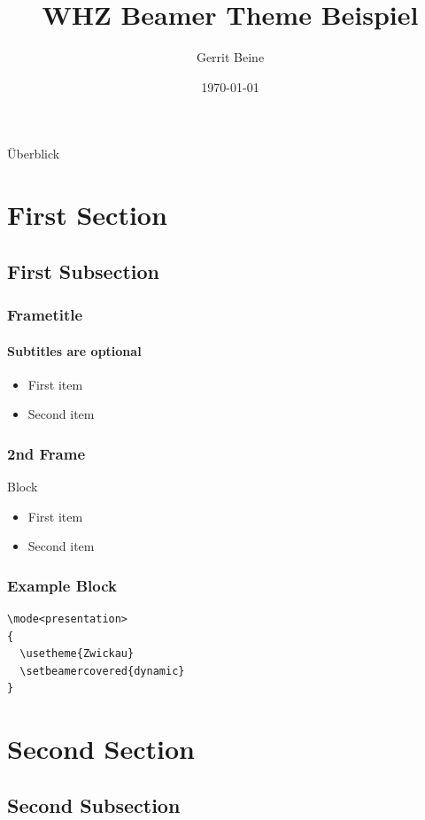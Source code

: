 \documentclass{beamer}
\title{WHZ Beamer Theme Beispiel}
\author{Gerrit Beine}
\date{\today}
\institute[Universities of Applied Sciences Zwickau]
\begin{document}
\begin{frame}
  \titlepage
\end{frame}

\begin{frame}{Überblick}
  \tableofcontents
\end{frame}

\section{First Section}

\subsection{First Subsection}

\begin{frame}
  \frametitle{Frametitle}
  \framesubtitle{Subtitles are optional}
  \begin{itemize}
    \item First item
    \item Second item
  \end{itemize}
\end{frame}

\begin{frame}
  \frametitle{2nd Frame}
  \begin{block}{Block}
    \begin{itemize}
      \item First item
      \item Second item
    \end{itemize}
  \end{block}
\end{frame}

\begin{frame}[fragile]
  \frametitle{Example Block}
  \begin{example}
     \begin{verbatim}
\mode<presentation>
{
  \usetheme{Zwickau}
  \setbeamercovered{dynamic}
}
     \end{verbatim}
  \end{example}
\end{frame}

\section{Second Section}

\subsection{Second Subsection}
\end{document}
